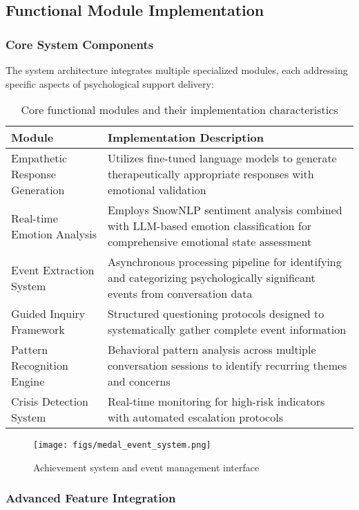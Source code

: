 \subsection{Functional Module Implementation}

\subsubsection{Core System Components}

The system architecture integrates multiple specialized modules, each addressing specific aspects of psychological support delivery:

\begin{table}[h]
\centering
\begin{tabular}{|l|p{8cm}|}
\hline
\textbf{Module} & \textbf{Implementation Description} \\
\hline
Empathetic Response Generation & Utilizes fine-tuned language models to generate therapeutically appropriate responses with emotional validation \\
\hline
Real-time Emotion Analysis & Employs SnowNLP sentiment analysis combined with LLM-based emotion classification for comprehensive emotional state assessment \\
\hline
Event Extraction System & Asynchronous processing pipeline for identifying and categorizing psychologically significant events from conversation data \\
\hline
Guided Inquiry Framework & Structured questioning protocols designed to systematically gather complete event information \\
\hline
Pattern Recognition Engine & Behavioral pattern analysis across multiple conversation sessions to identify recurring themes and concerns \\
\hline
Crisis Detection System & Real-time monitoring for high-risk indicators with automated escalation protocols \\
\hline
\end{tabular}
\caption{Core functional modules and their implementation characteristics}
\label{tab:functional_modules}
\end{table}

\begin{figure}[h]
\centering
\texttt{[image: figs/medal\_event\_system.png]}
\caption{Achievement system and event management interface}
\label{fig:medal_event_system}
\end{figure}

\subsubsection{Advanced Feature Integration}


